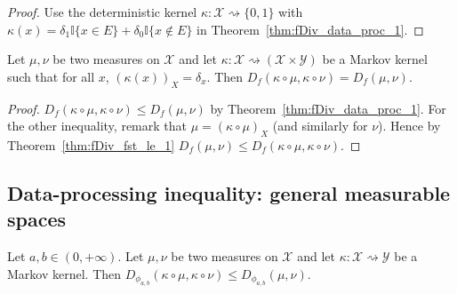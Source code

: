 \begin{proof}
Use the deterministic kernel $\kappa : \mathcal X \rightsquigarrow \{0, 1\}$ with $\kappa(x) = \delta_1 \mathbb{I}\{x \in E\} + \delta_0 \mathbb{I}\{x \notin E\}$ in Theorem~\ref{thm:fDiv_data_proc_1}.
\end{proof}

\begin{lemma}
  \label{lem:fDiv_compProd_prod_eq}
  Let $\mu, \nu$ be two measures on $\mathcal X$ and let $\kappa : \mathcal X \rightsquigarrow (\mathcal X \times \mathcal Y)$ be a Markov kernel such that for all $x$, $(\kappa(x))_X = \delta_x$. Then $D_f(\kappa \circ \mu, \kappa \circ \nu) = D_f(\mu, \nu)$.
\end{lemma}

\begin{proof}
$D_f(\kappa \circ \mu, \kappa \circ \nu) \le D_f(\mu, \nu)$ by Theorem~\ref{thm:fDiv_data_proc_1}.
For the other inequality, remark that $\mu = (\kappa \circ \mu)_X$ (and similarly for $\nu$). Hence by Theorem~\ref{thm:fDiv_fst_le_1} $D_f(\mu, \nu) \le D_f(\kappa \circ \mu, \kappa \circ \nu)$.
\end{proof}




\subsection{Data-processing inequality: general measurable spaces}

\begin{lemma}
  \label{lem:fDiv_phi_data_proc}
  Let $a,b \in (0, +\infty)$. Let $\mu, \nu$ be two measures on $\mathcal X$ and let $\kappa : \mathcal X \rightsquigarrow \mathcal Y$ be a Markov kernel.
  Then $D_{\phi_{a,b}}(\kappa \circ \mu, \kappa \circ \nu) \le D_{\phi_{a,b}}(\mu, \nu)$.
\end{lemma}

